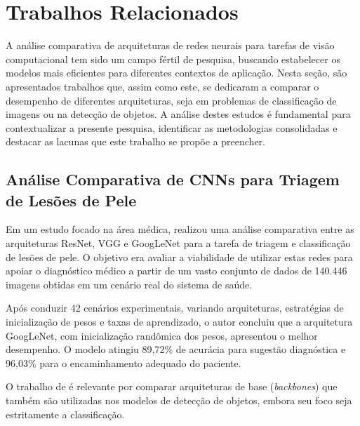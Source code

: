 \chapter{Trabalhos Relacionados}
\label{cap:trabalhos}

A análise comparativa de arquiteturas de redes neurais para tarefas de visão computacional tem
sido um campo fértil de pesquisa, buscando estabelecer os modelos mais eficientes para
diferentes contextos de aplicação. Nesta seção, são apresentados trabalhos que, assim como
este, se dedicaram a comparar o desempenho de diferentes arquiteturas, seja em problemas de
classificação de imagens ou na detecção de objetos. A análise destes estudos é fundamental
para contextualizar a presente pesquisa, identificar as metodologias consolidadas e destacar
as lacunas que este trabalho se propõe a preencher.

\section{Análise Comparativa de CNNs para Triagem de Lesões de Pele}

Em um estudo focado na área médica,  realizou uma análise comparativa
entre as arquiteturas ResNet, VGG e GoogLeNet para a tarefa de triagem e classificação de
lesões de pele. O objetivo era avaliar a viabilidade de utilizar estas redes para apoiar o
diagnóstico médico a partir de um vasto conjunto de dados de 140.446 imagens obtidas em um
cenário real do sistema de saúde.

Após conduzir 42 cenários experimentais, variando arquiteturas, estratégias de inicialização
de pesos e taxas de aprendizado, o autor concluiu que a arquitetura GoogLeNet, com
inicialização randômica dos pesos, apresentou o melhor desempenho. O modelo atingiu 89,72\%
de acurácia para sugestão diagnóstica e 96,03\% para o encaminhamento adequado do paciente.

O trabalho de  é relevante por comparar arquiteturas de base
(\textit{backbones}) que também são utilizadas nos modelos de detecção de objetos, embora seu
foco seja estritamente a classificação.

